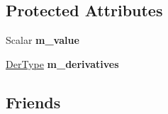 \subsection*{Protected Attributes}
\begin{DoxyCompactItemize}
\item 
\mbox{\label{class_eigen_1_1_auto_diff_scalar_ae7a12e09b363116102be944b9ca30dae}} 
Scalar {\bfseries m\+\_\+value}
\item 
\mbox{\label{class_eigen_1_1_auto_diff_scalar_aa76f86fcb362af42944a13e6f2bb3a37}} 
\hyperlink{group___sparse_core___module}{Der\+Type} {\bfseries m\+\_\+derivatives}
\end{DoxyCompactItemize}
\subsection*{Friends}
